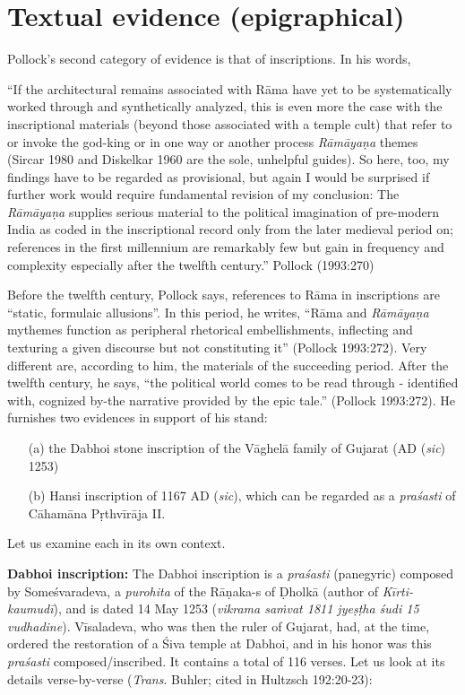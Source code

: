 \section{Textual evidence (epigraphical)}\label{sec3.2}

Pollock’s second category of evidence is that of inscriptions. In his words, 

\begin{myquote}
“If the architectural remains associated with Rāma have yet to be systematically worked through and synthetically analyzed, this is even more the case with the inscriptional materials (beyond those associated with a temple cult) that refer to or invoke the god-king or in one way or another process {\sl Rāmāyaṇa} themes (Sircar 1980 and Diskelkar 1960 are the sole, unhelpful guides). So here, too, my findings have to be regarded as provisional, but again I would be surprised if further work would require fundamental revision of my conclusion: The {\sl Rāmāyaṇa} supplies serious material to the political imagination of pre-modern India as coded in the inscriptional record only from the later medieval period on; references in the first millennium are remarkably few but gain in frequency and complexity especially after the twelfth century.”
\hfill Pollock (1993:270)
\end{myquote}

Before the twelfth century, Pollock says, references to Rāma in inscriptions are “static, formulaic allusions”. In this period, he writes, “Rāma and {\sl Rāmāyaṇa} mythemes function as peripheral rhetorical embellishments, inflecting and texturing a given discourse but not constituting it” (Pollock 1993:272). Very different are, according to him, the materials of the succeeding period. After the twelfth century, he says, “the political world comes to be read through - identified with, cognized by-the narrative provided by the epic tale.” (Pollock 1993:272). He furnishes two evidences in support of his stand: 
\begin{itemize}
\itemsep=1pt
\item[(a)] the Dabhoi stone inscription of the Vāghelā family of Gujarat (AD ({\sl sic}) 1253) 
\item[(b)] Hansi inscription of 1167 AD ({\sl sic}), which can be regarded as a {\sl praśasti} of Cāhamāna Pṛthvīrāja II. 
\end{itemize}
Let us examine each in its own context. 

\smallskip
\noindent
{\bf Dabhoi inscription:} The Dabhoi inscription is a {\sl praśasti} (panegyric) composed by Someśvaradeva, a {\sl purohita} of the Rāṇaka-s of Ḍholkā (author of {\sl Kīrti-kaumudī}), and is dated 14 May 1253 ({\sl vikrama saṁvat 1811 jyeṣṭha śudi 15 vudhadine}). Vīsaladeva, who was then the ruler of Gujarat, had, at the time, ordered the restoration of a Śiva temple at Dabhoi, and in his honor was this {\sl praśasti} composed/inscribed. It contains a total of 116 verses. Let us look at its details verse-by-verse ({\sl Trans}. Buhler; cited in Hultzsch 192:20-23):

